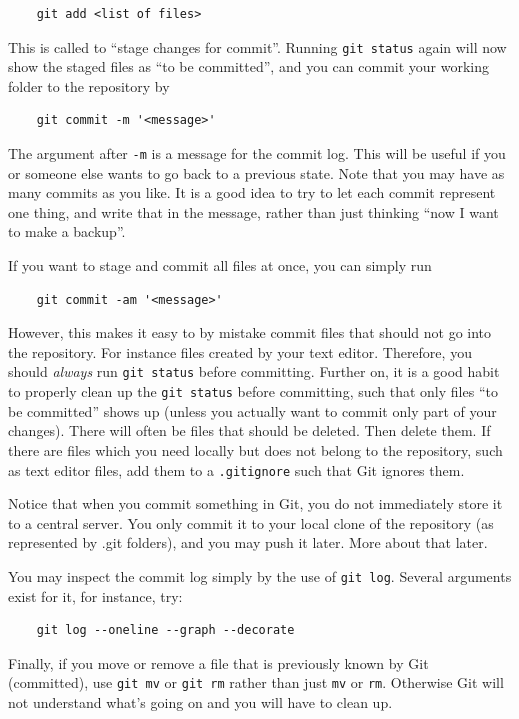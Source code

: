 \documentclass[10pt,a4paper]{article}
\begin{document}
\begin{verbatim}
	git add <list of files>
\end{verbatim}
This is called to ``stage changes for commit''. Running \verb$git status$ again will now show the staged files as ``to be committed'', and you can commit your working folder to the repository by

\begin{verbatim}
	git commit -m '<message>'
\end{verbatim}
The argument after \verb$-m$ is a message for the commit log. This will be useful if you or someone else wants to go back to a previous state. Note that you may have as many commits as you like. It is a good idea to try to let each commit represent one thing, and write that in the message, rather than just thinking ``now I want to make a backup''.

If you want to stage and commit all files at once, you can simply run

\begin{verbatim}
	git commit -am '<message>'
\end{verbatim}
However, this makes it easy to by mistake commit files that should not go into the repository. For instance files created by your text editor. Therefore, you should \emph{always} run \verb$git status$ before committing. Further on, it is a good habit to properly clean up the \verb$git status$ before committing, such that only files ``to be committed'' shows up (unless you actually want to commit only part of your changes). There will often be files that should be deleted. Then delete them. If there are files which you need locally but does not belong to the repository, such as text editor files, add them to a \verb$.gitignore$ such that Git ignores them.

Notice that when you commit something in Git, you do not immediately store it to a central server. You only commit it to your local clone of the repository (as represented by .git folders), and you may push it later. More about that later.

You may inspect the commit log simply by the use of \verb$git log$. Several arguments exist for it, for instance, try:

\begin{verbatim}
	git log --oneline --graph --decorate
\end{verbatim}

Finally, if you move or remove a file that is previously known by Git (committed), use \verb$git mv$ or \verb$git rm$ rather than just \verb$mv$ or \verb$rm$. Otherwise Git will not understand what's going on and you will have to clean up.
\end{document}

